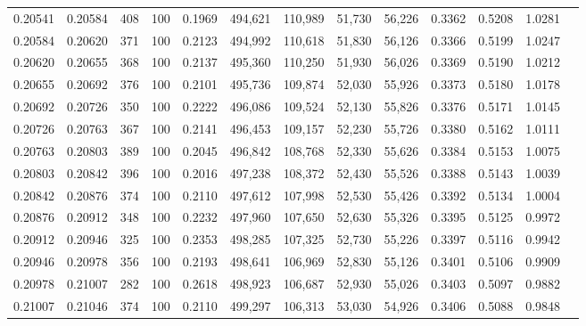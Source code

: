 \begin{tabular}{rrrrrrrrrrrrr}
0.20541 & 0.20584 &   408 & 100 &                                     0.1969 & 494,621 & 110,989 &  51,730 &  56,226 & 0.3362 & 0.5208 & 1.0281 \\
0.20584 & 0.20620 &   371 & 100 &                                     0.2123 & 494,992 & 110,618 &  51,830 &  56,126 & 0.3366 & 0.5199 & 1.0247 \\
0.20620 & 0.20655 &   368 & 100 &                                     0.2137 & 495,360 & 110,250 &  51,930 &  56,026 & 0.3369 & 0.5190 & 1.0212 \\
0.20655 & 0.20692 &   376 & 100 &                                     0.2101 & 495,736 & 109,874 &  52,030 &  55,926 & 0.3373 & 0.5180 & 1.0178 \\
0.20692 & 0.20726 &   350 & 100 &                                     0.2222 & 496,086 & 109,524 &  52,130 &  55,826 & 0.3376 & 0.5171 & 1.0145 \\
0.20726 & 0.20763 &   367 & 100 &                                     0.2141 & 496,453 & 109,157 &  52,230 &  55,726 & 0.3380 & 0.5162 & 1.0111 \\
0.20763 & 0.20803 &   389 & 100 &                                     0.2045 & 496,842 & 108,768 &  52,330 &  55,626 & 0.3384 & 0.5153 & 1.0075 \\
0.20803 & 0.20842 &   396 & 100 &                                     0.2016 & 497,238 & 108,372 &  52,430 &  55,526 & 0.3388 & 0.5143 & 1.0039 \\
0.20842 & 0.20876 &   374 & 100 &                                     0.2110 & 497,612 & 107,998 &  52,530 &  55,426 & 0.3392 & 0.5134 & 1.0004 \\
0.20876 & 0.20912 &   348 & 100 &                                     0.2232 & 497,960 & 107,650 &  52,630 &  55,326 & 0.3395 & 0.5125 & 0.9972 \\
0.20912 & 0.20946 &   325 & 100 &                                     0.2353 & 498,285 & 107,325 &  52,730 &  55,226 & 0.3397 & 0.5116 & 0.9942 \\
0.20946 & 0.20978 &   356 & 100 &                                     0.2193 & 498,641 & 106,969 &  52,830 &  55,126 & 0.3401 & 0.5106 & 0.9909 \\
0.20978 & 0.21007 &   282 & 100 &                                     0.2618 & 498,923 & 106,687 &  52,930 &  55,026 & 0.3403 & 0.5097 & 0.9882 \\
0.21007 & 0.21046 &   374 & 100 &                                     0.2110 & 499,297 & 106,313 &  53,030 &  54,926 & 0.3406 & 0.5088 & 0.9848 \\

\end{tabular}
